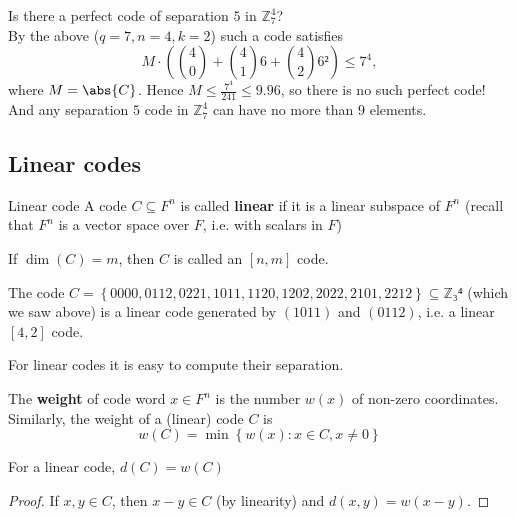 \documentclass[english]{lbscript}
\begin{document}
\begin{example}{}{}
	Is there a perfect code of separation \(5\) in \(ℤ_{7}^{4}\)?\\
	By the above (\(q=7, n=4, k=2\)) such a code satisfies
	\begin{equation}
		\label{eq:137}
		M⋅\left(\binom{4}{0}+ \binom{4}{1}6+\binom{4}{2}6² \right) ≤ 7^{4} ,
	\end{equation}
	where \(M=\abs{C}\). Hence \(M≤ \frac{7^{4}}{241}≤9.96\), so there is no such perfect code!\\
	And any separation \(5\) code in \(ℤ_{7}^{4}\) can have no more than 9 elements.
\end{example}

\subsection{Linear codes}
\label{sec:linear-codes}

\begin{definition}{Linear code}{}
	A code \(C⊆F^{n}\) is called \textbf{linear} if it is a linear subspace of \(F^{n}\) (recall that \(F^{n}\) is a vector space over \(F\), i.e. with scalars in \(F\))

	If \(\dim(C)=m\), then \(C\) is called an \([n, m]\) code.
\end{definition}

\begin{example}{}{}
	The code \(C=\left\{ 0000, 0112, 0221, 1011, 1120, 1202, 2022, 2101, 2212 \right\} ⊆ ℤ₃⁴\) (which we saw above) is a linear code generated by \((1011)\) and \((0112)\), i.e. a linear \([4,2]\) code.
\end{example}

For linear codes it is easy to compute their separation.

\begin{definition}{}{}
	The \textbf{weight} of code word \(x∈F^{n}\) is the number \(w(x)\) of non-zero coordinates. Similarly, the weight of a (linear) code \(C\) is
	\begin{equation}
		\label{eq:138}
		w(C) = \min\left\{ w(x): x∈C, x≠0 \right\}
	\end{equation}
\end{definition}
\begin{theorem}{}{}
	For a linear code, \(d(C)=w(C)\)
\end{theorem}
\begin{proof}
	If \(x,y∈C\), then \(x-y∈C\) (by linearity) and \(d(x,y)=w(x-y)\).
\end{proof}
\end{document}
